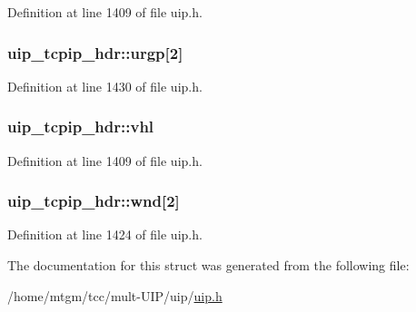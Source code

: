 Definition at line 1409 of file uip.h.

\hypertarget{structuip__tcpip__hdr_adc7001682017599549f57771f4cd1b9a}{
\subsubsection[{urgp}]{ {\bf uip\_\-tcpip\_\-hdr::urgp}\mbox{[}2\mbox{]}}}
\label{structuip__tcpip__hdr_adc7001682017599549f57771f4cd1b9a}


Definition at line 1430 of file uip.h.

\hypertarget{structuip__tcpip__hdr_ae1e60d56ea87dfa09230e25ca5ecf2fc}{
\subsubsection[{vhl}]{ {\bf uip\_\-tcpip\_\-hdr::vhl}}}
\label{structuip__tcpip__hdr_ae1e60d56ea87dfa09230e25ca5ecf2fc}


Definition at line 1409 of file uip.h.

\hypertarget{structuip__tcpip__hdr_a7f0ab3fe3bcf1e3ed9f5950cb4474ec1}{
\subsubsection[{wnd}]{ {\bf uip\_\-tcpip\_\-hdr::wnd}\mbox{[}2\mbox{]}}}
\label{structuip__tcpip__hdr_a7f0ab3fe3bcf1e3ed9f5950cb4474ec1}


Definition at line 1424 of file uip.h.



The documentation for this struct was generated from the following file:\begin{DoxyCompactItemize}
\item 
/home/mtgm/tcc/mult-\/UIP/uip/\hyperlink{uip_8h}{uip.h}\end{DoxyCompactItemize}
